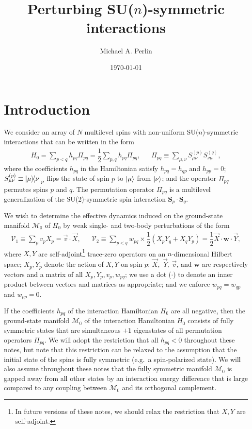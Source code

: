 \documentclass[nofootinbib,notitlepage,11pt]{revtex4-2}
\newcommand{\f}[2]{\dfrac{#1}{#2}} %
\newcommand{\p}[1]{\left(#1\right)} %
\renewcommand{\c}{\cdot} %
\newcommand{\m}{\bm} %
\renewcommand{\v}{\vec} %
\newcommand{\1}{\mathds{1}}
\newcommand{\M}{\mathcal{M}}
\newcommand{\V}{\mathcal{V}}
\begin{document}
\title{Perturbing SU($n$)-symmetric interactions}%
\author{Michael A. Perlin}%
\date{\today}

\maketitle

\tableofcontents

\section{Introduction}

We consider an array of $N$ multilevel spins with non-uniform
SU($n$)-symmetric interactions that can be written in the form
\begin{align}
  H_0 = \sum_{p<q} h_{pq} \Pi_{pq}
  = \f12 \sum_{p,q} h_{pq} \Pi_{pq},
  &&
  \Pi_{pq} \equiv \sum_{\mu,\nu} S_{\mu\nu}^{(p)} S_{\nu\mu}^{(q)},
  \label{eq:ints}
\end{align}
where the coefficients $h_{pq}$ in the Hamiltonian satisfy
$h_{pq}=h_{qp}$ and $h_{pp}=0$;
$S_{\mu\nu}^{(p)}\equiv\op{\mu}{\nu}_p$ flips the state of spin $p$ to
$\ket\mu$ from $\ket\nu$; and the operator $\Pi_{pq}$ permutes spins
$p$ and $q$.  The permutation operator $\Pi_{pq}$ is a multilevel
generalization of the SU(2)-symmetric spin interaction
$\m S_p\c\m S_q$.

We wish to determine the effective dynamics induced on the
ground-state manifold $\M_0$ of $H_0$ by weak single- and two-body
perturbations of the form
\begin{align}
  \V_1 \equiv \sum_p v_p X_p = \v v\c\v X,
  &&
  \V_2 \equiv \sum_{p<q} w_{pq} \times \f12 \p{X_p Y_q + X_q Y_p}
  = \f12 \v X \c\m w \c\v Y,
  \label{eq:perturbations}
\end{align}
where $X,Y$ are self-adjoint\footnote{In future versions of these
  notes, we should relax the restriction that $X,Y$ are self-adjoint.}
trace-zero operators on an $n$-dimensional Hilbert space; $X_p,Y_p$
denote the action of $X,Y$ on spin $p$; $\v X,$ $\v Y$, $\v v$, and
$\m w$ are respectively vectors and a matrix of all
$X_p,Y_p,v_p,w_{pq}$; we use a dot ($\c$) to denote an inner product
between vectors and matrices as appropriate; and we enforce
$w_{pq}=w_{qp}$ and $w_{pp}=0$.

If the coefficients $h_{pq}$ of the interaction Hamiltonian $H_0$ are
all negative, then the ground-state manifold $\M_0$ of the interaction
Hamiltonian $H_0$ consists of fully symmetric states that are
simultaneous $+1$ eigenstates of all permutation operators $\Pi_{pq}$.
We will adopt the restriction that all $h_{pq}<0$ throughout these
notes, but note that this restriction can be relaxed to the assumption
that the initial state of the spins is fully symmetric (e.g.~a
spin-polarized state).  We will also assume throughout these notes
that the fully symmetric manifold $\M_0$ is gapped away from all other
states by an interaction energy difference that is large compared to
any coupling between $\M_0$ and its orthogonal complement.
\end{document}
